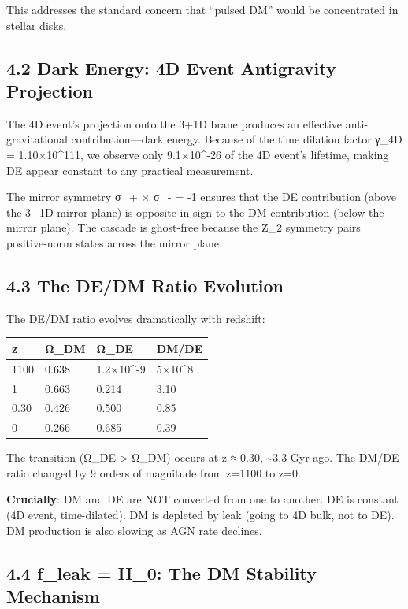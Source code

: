 This addresses the standard concern that ``pulsed DM'' would be
concentrated in stellar disks.

\hypertarget{dark-energy-4d-event-antigravity-projection}{%
\subsection{4.2 Dark Energy: 4D Event Antigravity
Projection}\label{dark-energy-4d-event-antigravity-projection}}

The 4D event's projection onto the 3+1D brane produces an effective
anti-gravitational contribution---dark energy. Because of the time
dilation factor γ\_4D = 1.10×10\^{}111, we observe only 9.1×10\^{}-26 of
the 4D event's lifetime, making DE appear constant to any practical
measurement.

The mirror symmetry σ\_+ × σ\_- = -1 ensures that the DE contribution
(above the 3+1D mirror plane) is opposite in sign to the DM contribution
(below the mirror plane). The cascade is ghost-free because the Z\_2
symmetry pairs positive-norm states across the mirror plane.

\hypertarget{the-dedm-ratio-evolution}{%
\subsection{4.3 The DE/DM Ratio
Evolution}\label{the-dedm-ratio-evolution}}

The DE/DM ratio evolves dramatically with redshift:

\begin{longtable}[]{@{}llll@{}}
\toprule
z & Ω\_DM & Ω\_DE & DM/DE \\
\midrule
\endhead
1100 & 0.638 & 1.2×10\^{}-9 & 5×10\^{}8 \\
1 & 0.663 & 0.214 & 3.10 \\
0.30 & 0.426 & 0.500 & 0.85 \\
0 & 0.266 & 0.685 & 0.39 \\
\bottomrule
\end{longtable}

The transition (Ω\_DE \textgreater{} Ω\_DM) occurs at z ≈ 0.30,
\textasciitilde3.3 Gyr ago. The DM/DE ratio changed by 9 orders of
magnitude from z=1100 to z=0.

\textbf{Crucially}: DM and DE are NOT converted from one to another. DE
is constant (4D event, time-dilated). DM is depleted by leak (going to
4D bulk, not to DE). DM production is also slowing as AGN rate declines.

\hypertarget{f_leak-h_0-the-dm-stability-mechanism}{%
\subsection{4.4 f\_leak = H\_0: The DM Stability
Mechanism}\label{f_leak-h_0-the-dm-stability-mechanism}}

